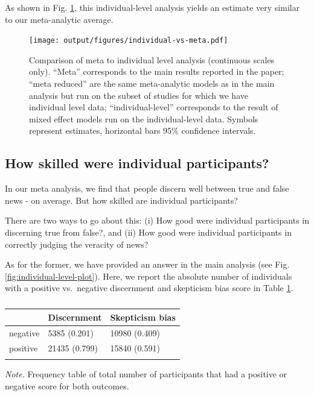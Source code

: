 \documentclass[
  doc,floatsintext]{apa6}
\begin{document}
As shown in Fig. \ref{fig:individual-vs-meta}, this individual-level analysis yields an estimate very similar to our meta-analytic average.



\begin{figure}
\centering
\texttt{[image: output/figures/individual-vs-meta.pdf]}
\caption{\label{fig:individual-vs-meta}Comparison of meta to individual level analysis (continuous scales only). ``Meta'' corresponds to the main results reported in the paper; ``meta reduced'' are the same meta-analytic models as in the main analysis but run on the subset of studies for which we have individual level data; ``individual-level'' corresponds to the result of mixed effect models run on the individual-level data. Symbols represent estimates, horizontal bars 95\% confidence intervals.}
\end{figure}

\subsection{How skilled were individual participants?}\label{how-skilled-were-individual-participants}

In our meta analysis, we find that people discern well between true and false news - on average. But how skilled are individual participants?

There are two ways to go about this: (i) How good were individual participants in discerning true from false?, and (ii) How good were individual participants in correctly judging the veracity of news?

As for the former, we have provided an answer in the main analysis (see Fig. \ref{fig:individual-level-plot}). Here, we report the absolute number of individuals with a positive vs.~negative discernment and skepticism bias score in Table \ref{tab:individuals-direction}.

\begin{table}[tbp]

\begin{center}
\begin{threeparttable}

\caption{\label{tab:individuals-direction}}

\begin{tabular}{lll}
\toprule
 & \multicolumn{1}{c}{Discernment} & \multicolumn{1}{c}{Skepticism  bias}\\
\midrule
negative & 5385 (0.201) & 10980 (0.409)\\
positive & 21435 (0.799) & 15840 (0.591)\\
\bottomrule
\addlinespace
\end{tabular}

\begin{tablenotes}[para]
\normalsize{\textit{Note.} Frequency table of total number of participants that had a positive or negative score for both outcomes.}
\end{tablenotes}

\end{threeparttable}
\end{center}

\end{table}
\end{document}
